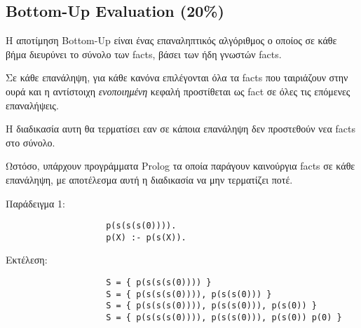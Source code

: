 \documentclass[10pt]{article}
\begin{document}




\subsection*{Bottom-Up Evaluation (20\%)}

H αποτίμηση Bottom-Up είναι ένας επαναληπτικός αλγόριθμος ο οποίος σε κάθε βήμα διευρύνει το σύνολο των facts, βάσει των ήδη γνωστών facts.\

Σε κάθε επανάληψη, για κάθε κανόνα επιλέγονται όλα τα facts που ταιριάζουν στην ουρά και η αντίστοιχη \textit{ενοποιημένη} κεφαλή προστίθεται ως fact σε όλες τις επόμενες επαναλήψεις.\

Η διαδικασία αυτη θα τερματίσει εαν σε κάποια επανάληψη δεν προστεθούν νεα facts στο σύνολο.\

Ωστόσο, υπάρχουν προγράμματα Prolog τα οποία παράγουν καινούργια facts σε κάθε επανάληψη, με αποτέλεσμα αυτή η διαδικασία να μην τερματίζει ποτέ.\


Παράδειγμα 1:
\begin{verbatim}
                    p(s(s(s(0)))).
                    p(Χ) :- p(s(Χ)).
\end{verbatim}

Εκτέλεση:
\begin{verbatim}
                    S = { p(s(s(s(0)))) }
                    S = { p(s(s(s(0)))), p(s(s(0))) }
                    S = { p(s(s(s(0)))), p(s(s(0))), p(s(0)) }
                    S = { p(s(s(s(0)))), p(s(s(0))), p(s(0)) p(0) }
\end{verbatim}
\end{document}
